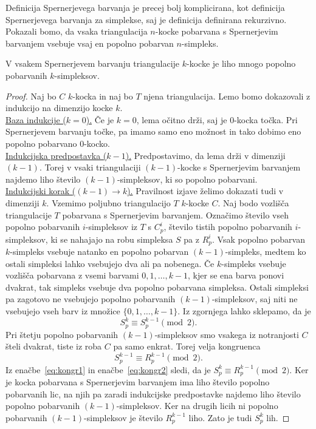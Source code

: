 \documentclass[mat1]{fmfdelo}
\newcommand{\0}{\underline{0}}
\begin{document}
Definicija Spernerjevega barvanja je precej bolj komplicirana, kot definicija Spernerjevega barvanja za simplekse, saj je definicija \label{def:cubsperner} definirana rekurzivno.
Pokazali bomo, da vsaka triangulacija $n$-kocke pobarvana s Spernerjevim barvanjem vsebuje vsaj en popolno pobarvan $n$-simpleks.
\begin{lema}\label{izr:kubsperner}
V vsakem Spernerjevem barvanju triangulacije $k$-kocke je liho mnogo popolno pobarvanih $k$-simpleksov.
\end{lema}
\begin{proof}
Naj bo $C$ $k$-kocka in naj bo $T$ njena triangulacija. Lemo bomo dokazovali z indukcijo na dimenzijo kocke $k$. \\
\underline{Baza indukcije ($k = 0$).}
Če je $k=0$, lema očitno drži, saj je $0$-kocka točka. Pri Spernerjevem barvanju točke, pa imamo samo eno možnost in tako dobimo eno popolno pobarvano $0$-kocko.\\
\underline{Indukcijska predpostavka ($k - 1$).}
Predpostavimo, da lema drži v dimenziji $(k - 1)$. Torej v vsaki triangulaciji $(k - 1)$-kocke s Spernerjevim barvanjem najdemo liho število $(k - 1)$-simpleksov, ki so popolno pobarvani. \\
\underline{Indukcijski korak ($(k - 1) \rightarrow k$).}
Pravilnost izjave želimo dokazati tudi v dimenziji $k$. Vzemimo poljubno triangulacijo $T$ $k$-kocke $C$. Naj bodo vozlišča triangulacije $T$ pobarvana s Spernerjevim barvanjem. Označimo število vseh popolno pobarvanih $i$-simpleksov iz $T$ s $C_p^i$, število tistih popolno pobarvanih $i$-simpleksov, ki se nahajajo na robu simpleksa $S$ pa z $R_p^i$. Vsak popolno pobarvan $k$-simpleks vsebuje natanko en popolno pobarvan $(k-1)$-simpleks, medtem ko ostali simpleksi lahko vsebujejo dva ali pa nobenega. Če $k$-simpleks vsebuje vozlišča pobarvana z vsemi barvami $0, 1, \dots, k-1$, kjer se ena barva ponovi dvakrat, tak simpleks vsebuje dva popolno pobarvana simpleksa. Ostali simpleksi pa zagotovo ne vsebujejo popolno pobarvanih $(k - 1)$-simpleksov, saj niti ne vsebujejo vseh barv iz množice $\{0, 1, \dots, k-1 \}$. Iz zgornjega lahko sklepamo, da je
\begin{equation}\label{eq:kongr1}
S_p^k \equiv S_p^{k-1} \pmod 2.
\end{equation}
Pri štetju popolno pobarvanih $(k - 1)$-simpleksov smo vsakega iz notranjosti $C$ šteli dvakrat, tiste iz roba $C$ pa samo enkrat. Torej velja kongruenca 
\begin{equation}\label{eq:kongr2}
S_p^{k-1} \equiv R_p^{k - 1} \pmod 2.
\end{equation}
Iz enačbe~\ref{eq:kongr1} in enačbe~\ref{eq:kongr2} sledi, da je $S_p^k \equiv R_p^{k - 1} \pmod 2$.
Ker je kocka pobarvana s Spernerjevim barvanjem ima liho število popolno pobarvanih lic, na njih pa zaradi indukcijske predpostavke najdemo liho število popolno pobarvanih $(k - 1)$-simpleksov. Ker na drugih licih ni popolno pobarvanih $(k - 1)$-simpleksov je število $R_p^{k - 1}$ liho. Zato je tudi $S_p^k$ lih.
\end{proof}
%
\end{document}
